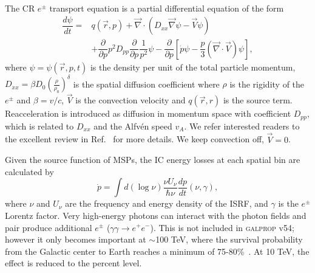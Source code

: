 \documentclass[doublespace,nopageskip]{VTthesis} %
\begin{document}
The CR $e^\pm$ transport equation is a partial differential equation of the form
\begin{align}
  \label{eq:prop_eq}
  \dfrac{d\psi}{dt} = &q(\vec{r},p)+\vec{\nabla}\cdot(D_{xx}\vec{\nabla}\psi-\vec{V}\psi)\nonumber\\
                       &+\dfrac{\partial}{\partial p}p^2D_{pp}\dfrac{\partial}{\partial p}\dfrac{1}{p^2}\psi-\dfrac{\partial}{\partial p}[\dot{p}\psi-\dfrac{p}{3}(\vec{\nabla}\cdot\vec{V})\psi],
\end{align}
where $\psi = \psi(\vec{r},p,t)$ is the density per unit of the total particle momentum, $D_{xx} = \beta D_0 (\frac{\rho}{\rho_0})^\delta$ is the spatial diffusion coefficient where $\rho$ is the rigidity of the $e^\pm$ and $\beta = v/c$, $\vec{V}$ is the convection velocity and $q(\vec{r},r)$ is the source term. Reacceleration is introduced as diffusion in momentum space with coefficient $D_{pp}$, which is related to $D_{xx}$ and the Alfv\'{e}n speed $v_A$. We refer interested readers to the excellent review in Ref.~\cite{2007ARNPS..57..285S} for more details. We keep convection off, $\vec{V}=0$.

Given the source function of MSPs, the IC energy losses at each spatial bin are calculated by
\begin{equation}
  \dot{p} = \int d(\log{\nu})\dfrac{\nu U_\nu}{\hbar \nu}\dfrac{dp}{dt}(\nu,\gamma),
\end{equation}
where $\nu$ and $U_\nu$ are the frequency and energy density of the ISRF, and $\gamma$ is the $e^\pm$ Lorentz factor. Very high-energy photons can interact with the photon fields and pair produce additional $e^\pm$ ($\gamma\gamma \to e^+e^-$). This is not included in \textsc{galprop} v54; however it only becomes important at $\sim$100 TeV, where the survival probability from the Galactic center to Earth reaches a minimum of 75-80\%~\cite{2006ApJ...640L.155M}. At 10 TeV, the effect is reduced to the percent level.
\end{document}
